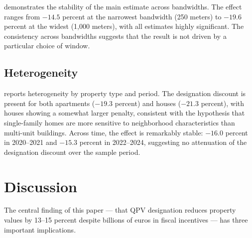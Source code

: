 \documentclass[12pt]{article}
\begin{document}
 demonstrates the stability of the main estimate across bandwidths. The effect ranges from $-14.5$ percent at the narrowest bandwidth (250 meters) to $-19.6$ percent at the widest (1,000 meters), with all estimates highly significant. The consistency across bandwidths suggests that the result is not driven by a particular choice of window.



\subsection{Heterogeneity}

 reports heterogeneity by property type and period. The designation discount is present for both apartments ($-19.3$ percent) and houses ($-21.3$ percent), with houses showing a somewhat larger penalty, consistent with the hypothesis that single-family homes are more sensitive to neighborhood characteristics than multi-unit buildings. Across time, the effect is remarkably stable: $-16.0$ percent in 2020--2021 and $-15.3$ percent in 2022--2024, suggesting no attenuation of the designation discount over the sample period.




\section{Discussion}

The central finding of this paper --- that QPV designation reduces property values by 13--15 percent despite billions of euros in fiscal incentives --- has three important implications.
\end{document}
